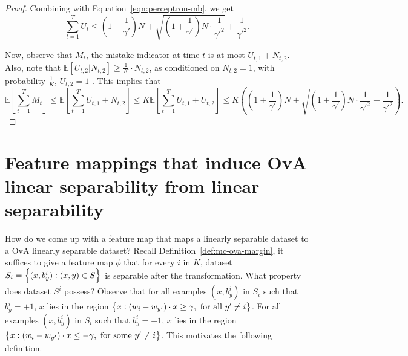 \documentclass{article}
\newcommand{\field}[1]{\mathbb{#1}}
\newcommand{\E}{\field{E}}
\begin{document}
\begin{proof}
Combining with Equation~\eqref{eqn:perceptron-mb}, we get
\[
\sum_{t=1}^T U_t  \leq (1 + \frac 1 {\gamma'}) N + \sqrt{ (1 + \frac 1 {\gamma'}) N \cdot \frac{1}{\gamma'^2} } + \frac{1}{\gamma'^2}.
\]

Now, observe that $M_t$, the mistake indicator at time $t$ is at most $U_{t,1} + N_{t,2}$. Also, note that $\E[U_{t,2} | N_{t,2}] \geq \frac 1 K \cdot N_{t,2}$, as conditioned on $N_{t,2} = 1$, with probability $\frac 1 K$, $U_{t,2} = 1$ . This implies that
\[
\E[\sum_{t=1}^T M_t ] \leq \E[\sum_{t=1}^T U_{t,1} + N_{t,2} ] \leq K \E[\sum_{t=1}^T U_{t,1} + U_{t,2} ]  \leq K ((1 + \frac 1 {\gamma'}) N + \sqrt{ (1 + \frac 1 {\gamma'}) N \cdot \frac{1}{\gamma'^2} } + \frac{1}{\gamma'^2}).
\]
\end{proof}


\section{Feature mappings that induce OvA linear separability from linear separability}

How do we come up with a feature map that maps a linearly separable dataset to a OvA linearly separable dataset? Recall Definition~\ref{def:mc-ova-margin}, it suffices to give a feature map $\phi$ that for every $i$ in $K$, dataset $S_i = \cbr{(x, b_y^i): (x,y) \in S}$ is separable after the transformation. What property does dataset $S^i$ possess? Observe that for all examples $(x,b_y^i)$ in $S_i$ such that $b_y^i = +1$, $x$ lies in the region $\cbr{x: (w_i - w_{y'}) \cdot x \geq \gamma, \text{ for all } y' \neq i}$. For all examples $(x,b_y^i)$ in $S_i$ such that $b_y^i = -1$, $x$ lies in the region $\cbr{x: (w_i - w_{y'}) \cdot x \leq -\gamma, \text{ for some } y' \neq i}$.
This motivates the following definition.
\end{document}
